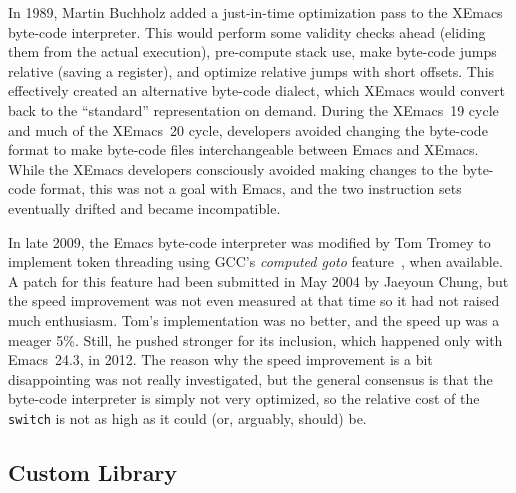 \documentclass[format=acmsmall,screen]{acmart}
\begin{document}
In 1989, Martin Buchholz added a just-in-time optimization pass to the
XEmacs byte-code interpreter.  This
would perform some validity checks ahead (eliding them from the actual
execution), pre-compute stack use, make byte-code jumps relative
(saving a register), and optimize relative jumps with short offsets.
This effectively created an alternative byte-code dialect, which
XEmacs would convert back to the ``standard'' representation on
demand.
During the XEmacs~19 cycle and much of the XEmacs~20 cycle, developers
avoided changing the byte-code format to make byte-code files
interchangeable between Emacs and XEmacs.  While
the XEmacs developers consciously avoided making changes to the
byte-code format, this was not a goal with Emacs, and the two
instruction sets eventually drifted and became incompatible.

In late 2009, the Emacs byte-code interpreter was modified by Tom Tromey to
implement token threading using GCC's \emph{computed goto} feature~\cite{ComputedGOTO}, when
available.  A patch for this feature had been submitted in May 2004 by
Jaeyoun Chung, but the speed improvement was not even measured at that time
so it had not raised much enthusiasm.  Tom's implementation was no better,
and the speed up was a meager 5\%. Still, he pushed stronger for its inclusion,
which happened only with Emacs~24.3, in 2012.  The reason why the speed
improvement is a bit disappointing was not really investigated, but the
general consensus is that the byte-code interpreter is simply not very
optimized, so the relative cost of the \texttt{switch} is not as high as it
could (or, arguably, should) be.

\subsection{Custom Library}
\label{sec:custom}
\end{document}
